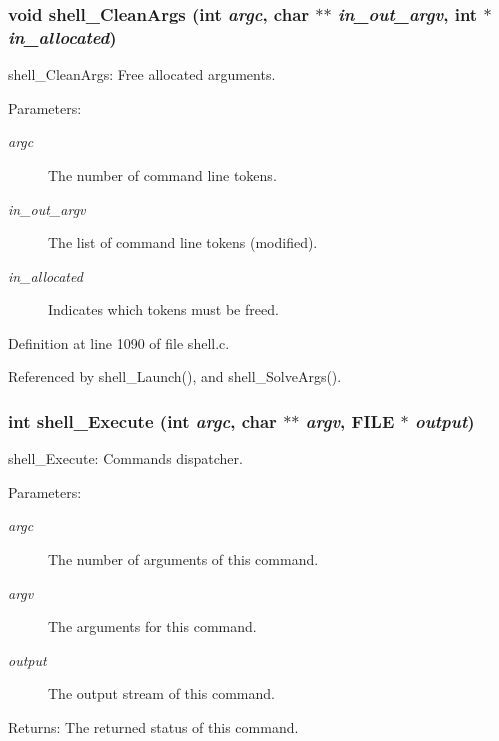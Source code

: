 \subsubsection{\setlength{\rightskip}{0pt plus 5cm}void shell\_\-Clean\-Args (int {\em argc}, char $\ast$$\ast$ {\em in\_\-out\_\-argv}, int $\ast$ {\em in\_\-allocated})}\label{shell_8c_a25}


shell\_\-Clean\-Args: Free allocated arguments.

\begin{Desc}
\item[Parameters:]
\begin{description}
\item[{\em argc}]The number of command line tokens. \item[{\em in\_\-out\_\-argv}]The list of command line tokens (modified). \item[{\em in\_\-allocated}]Indicates which tokens must be freed. \end{description}
\end{Desc}


Definition at line 1090 of file shell.c.

Referenced by shell\_\-Launch(), and shell\_\-Solve\-Args().
\subsubsection{\setlength{\rightskip}{0pt plus 5cm}int shell\_\-Execute (int {\em argc}, char $\ast$$\ast$ {\em argv}, FILE $\ast$ {\em output})}\label{shell_8c_a26}


shell\_\-Execute: Commands dispatcher.

\begin{Desc}
\item[Parameters:]
\begin{description}
\item[{\em argc}]The number of arguments of this command. \item[{\em argv}]The arguments for this command. \item[{\em output}]The output stream of this command.\end{description}
\end{Desc}
\begin{Desc}
\item[Returns:]The returned status of this command. \end{Desc}


